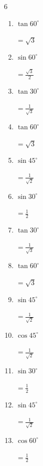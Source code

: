 \begin{multicols}{6}
\begin{enumerate}
  \item $\displaystyle \tan{60^\circ}$

        $\displaystyle =\sqrt{3}$

  \item $\displaystyle \sin{60^\circ}$

        $\displaystyle =\frac{\sqrt{3}}{2}$

  \item $\displaystyle \tan{30^\circ}$

        $\displaystyle =\frac{1}{\sqrt{3}}$

  \item $\displaystyle \tan{60^\circ}$

        $\displaystyle =\sqrt{3}$

  \item $\displaystyle \sin{45^\circ}$

        $\displaystyle =\frac{1}{\sqrt{2}}$

  \item $\displaystyle \sin{30^\circ}$

        $\displaystyle =\frac{1}{2}$

  \item $\displaystyle \tan{30^\circ}$

        $\displaystyle =\frac{1}{\sqrt{3}}$

  \item $\displaystyle \tan{60^\circ}$

        $\displaystyle =\sqrt{3}$

  \item $\displaystyle \sin{45^\circ}$

        $\displaystyle =\frac{1}{\sqrt{2}}$

  \item $\displaystyle \cos{45^\circ}$

        $\displaystyle =\frac{1}{\sqrt{2}}$

  \item $\displaystyle \sin{30^\circ}$

        $\displaystyle =\frac{1}{2}$

\columnbreak %

  \item $\displaystyle \sin{45^\circ}$

        $\displaystyle =\frac{1}{\sqrt{2}}$

  \item $\displaystyle \cos{60^\circ}$

        $\displaystyle =\frac{1}{2}$


\end{enumerate}
\end{multicols}
